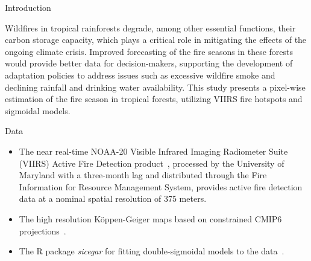 \documentclass[20pt]{beamer}
\begin{document}
\vspace*{-2cm}
\begin{frame}[fragile,t]
\begin{columns}[t]



\begin{column}{0.33\linewidth}

    \vspace{1.0cm}

    \begin{block}{Introduction\vphantom{g}}

    \vspace{1.0cm}

Wildfires in tropical rainforests degrade, among other essential functions, their carbon storage capacity, which plays a critical role in mitigating the effects of the ongoing climate crisis.
Improved forecasting of the fire seasons in these forests would provide better data for decision-makers, supporting the development of adaptation policies to address issues such as excessive wildfire smoke and declining rainfall and drinking water availability.
This study presents a pixel-wise estimation of the fire season in tropical forests, utilizing VIIRS fire hotspots and sigmoidal models.

    \end{block}

    \vspace{0.5cm}

    \begin{block}{Data\vphantom{g}}

\vspace{1.0cm}

\begin{itemize}
    \item The near real-time NOAA-20 Visible Infrared Imaging Radiometer Suite (VIIRS) Active Fire Detection product~\cite{nasaviirslandscienceteam2020}, processed by the University of Maryland with a three-month lag and distributed through the Fire Information for Resource Management System, provides active fire detection data at a nominal spatial resolution of 375 meters.
    \item The high resolution K\"{o}ppen-Geiger maps based on constrained CMIP6 projections~\cite{beck2023}.
    \item The R package \textit{sicegar} for fitting double-sigmoidal models to the data~\cite{caglar2018}.
\end{itemize}


\end{block}
\end{column}
\end{columns}
\end{frame}
\end{document}
